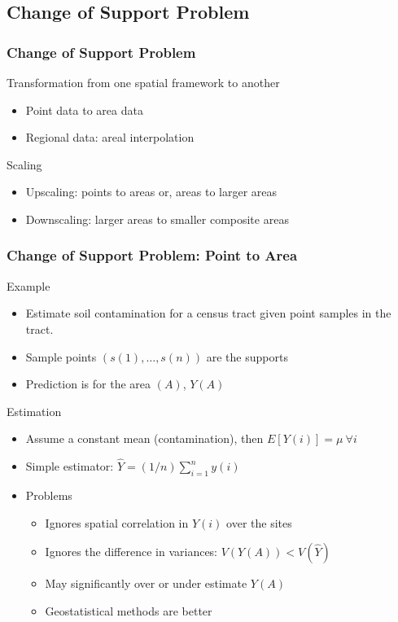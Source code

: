 \documentclass[nototal,handout]{beamer}
\begin{document}
\subsection{Change of Support Problem}
\begin{frame}[<+->]
  \frametitle{Change of Support Problem}
  \begin{block}{Transformation from one spatial framework to another}
    \begin{itemize}
      \item Point data to area data
      \item Regional data: areal interpolation
    \end{itemize}
   \end{block}
   \begin{block}{Scaling}
    \begin{itemize}
      \item Upscaling: points to areas or, areas to larger areas 
      \item Downscaling: larger areas to smaller composite areas
    \end{itemize}
   \end{block}

    \end{frame}

\begin{frame}[<+->]
  \frametitle{Change of Support Problem: Point to Area}

\begin{block}{Example}
     \begin{itemize}
       \item Estimate soil contamination for a census tract given point
	 samples in  the tract.
       \item Sample points $(s(1),\ldots,s(n))$ are the supports
       \item Prediction is for the area $(A)$, $Y(A)$
     \end{itemize}
    \end{block}

\begin{block}{Estimation}
     \begin{itemize}
       \item Assume a constant mean (contamination), then $E[Y(i)]=\mu \ \forall i$ 
       \item Simple estimator: $\hat{Y} = (1/n) \sum_{i=1}^n y(i)$
       \item Problems
	 \begin{itemize}
	   \item Ignores spatial correlation in $Y(i)$ over the sites
	   \item Ignores the difference in variances: $V(Y(A)) < V(\hat{Y})$
	   \item May significantly over or under estimate $Y(A)$
	   \item Geostatistical methods are better
	 \end{itemize}
     \end{itemize}
    \end{block}
  \end{frame}
 
\end{document}
